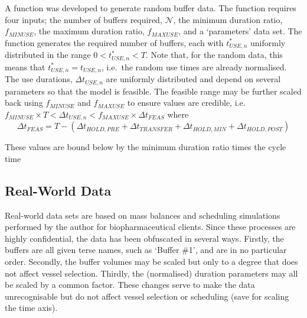 A function was developed to generate random buffer data.
The function requires four inputs; the number of buffers required,
$\mathcal{N}$, the minimum duration ratio, $f_{\mathit{MINUSE}}$, the maximum
duration ratio, $f_{\mathit{MAXUSE}}$, and a `parameters' data set.
The function generates the required number of buffers, each with
$t_{\mathit{USE},n}^{*}$ uniformly distributed in the range
$0 < t_{\mathit{USE},n}^{*} < T$. Note that, for the random data, this means
that $t_{\mathit{USE},n}^{*} = t_{\mathit{USE},n}$, i.e.\ the random use
times are already normalised.
The use durations, $\Delta t_{\mathit{USE},n}$ are uniformly distributed and
depend on several parameters so that the model is feasible.  The feasible range
may be further scaled back using $f_{\mathit{MINUSE}}$ and
$f_{\mathit{MAXUSE}}$ to ensure values are credible, i.e.
$f_{\mathit{MINUSE}} \times T < \Delta t_{\mathit{USE},n} < f_{\mathit{MAXUSE}}
 \times \Delta t_{\mathit{FEAS}}$
where
\begin{equation}
    \Delta t_{\mathit{FEAS}} = T - \left( 
    \Delta t_{\mathit{HOLD,PRE}}
    + \Delta t_{\mathit{TRANSFER}}
    + \Delta t_{\mathit{HOLD,MIN}}
    + \Delta t_{\mathit{HOLD,POST}} \right)
\end{equation}

These values are bound below by the minimum duration ratio times the cycle time

\subsection{Real-World Data}\label{SS.realdata}
Real-world data sets are based on mass balances and scheduling simulations
performed by the author for biopharmaceutical clients.
Since these processes are highly confidential, the data has been obfuscated in
several ways.
Firstly, the buffers are all given terse names, such as `Buffer \#1', and are
in no particular order.
Secondly, the buffer volumes may be scaled but only to a degree that does not
affect vessel selection.
Thirdly, the (normalised) duration parameters may all be scaled by a common
factor.
These changes serve to make the data unrecognisable but do not affect vessel
selection or scheduling (save for scaling the time axis).




